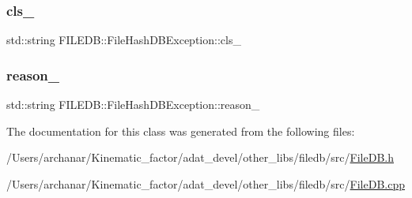 \subsubsection{\texorpdfstring{cls\_}{cls\_}}
{\footnotesize\ttfamily std\+::string F\+I\+L\+E\+D\+B\+::\+File\+Hash\+D\+B\+Exception\+::cls\+\_\+\hspace{0.3cm}{\ttfamily [protected]}}

\mbox{\label{classFILEDB_1_1FileHashDBException_a03d9f75945799fec0e00195daed5aaad}} 
\subsubsection{\texorpdfstring{reason\_}{reason\_}}
{\footnotesize\ttfamily std\+::string F\+I\+L\+E\+D\+B\+::\+File\+Hash\+D\+B\+Exception\+::reason\+\_\+\hspace{0.3cm}{\ttfamily [protected]}}



The documentation for this class was generated from the following files\+:\begin{DoxyCompactItemize}
\item 
/\+Users/archanar/\+Kinematic\+\_\+factor/adat\+\_\+devel/other\+\_\+libs/filedb/src/\mbox{\hyperlink{other__libs_2filedb_2src_2FileDB_8h}{File\+D\+B.\+h}}\item 
/\+Users/archanar/\+Kinematic\+\_\+factor/adat\+\_\+devel/other\+\_\+libs/filedb/src/\mbox{\hyperlink{FileDB_8cpp}{File\+D\+B.\+cpp}}\end{DoxyCompactItemize}
